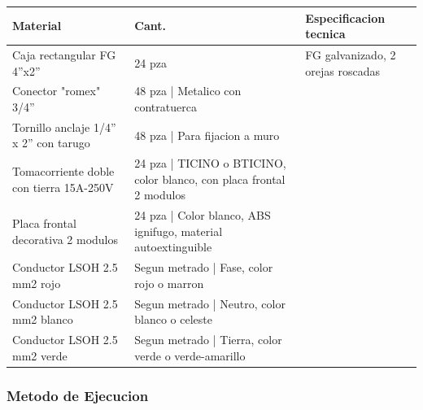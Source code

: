 \begin{longtable}{L{5.0cm} L{2.0cm} L{7.5cm}}
\toprule
\textbf{Material} & \textbf{Cant.} & \textbf{Especificacion tecnica} \\
\midrule
Caja rectangular FG 4''x2'' & 24 pza & FG galvanizado, 2 orejas roscadas \\
Conector "romex" 3/4'' & 48 pza | Metalico con contratuerca \\
Tornillo anclaje 1/4'' x 2'' con tarugo & 48 pza | Para fijacion a muro \\
Tomacorriente doble con tierra 15A-250V & 24 pza | TICINO o BTICINO, color blanco, con placa frontal 2 modulos \\
Placa frontal decorativa 2 modulos & 24 pza | Color blanco, ABS ignifugo, material autoextinguible \\
Conductor LSOH 2.5 mm2 rojo & Segun metrado | Fase, color rojo o marron \\
Conductor LSOH 2.5 mm2 blanco & Segun metrado | Neutro, color blanco o celeste \\
Conductor LSOH 2.5 mm2 verde & Segun metrado | Tierra, color verde o verde-amarillo \\
\bottomrule
\end{longtable}

\subsubsection{Metodo de Ejecucion}

